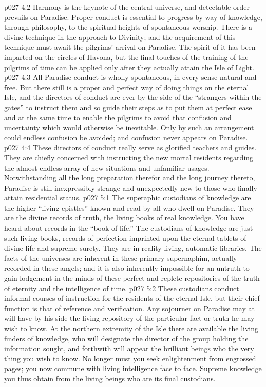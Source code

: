 \vs p027 4:2 Harmony is the keynote of the central universe, and detectable order prevails on Paradise. Proper conduct is essential to progress by way of knowledge, through philosophy, to the spiritual heights of spontaneous worship. There is a divine technique in the approach to Divinity; and the acquirement of this technique must await the pilgrims’ arrival on Paradise. The spirit of it has been imparted on the circles of Havona, but the final touches of the training of the pilgrims of time can be applied only after they actually attain the Isle of Light.
\vs p027 4:3 All Paradise conduct is wholly spontaneous, in every sense natural and free. But there still is a proper and perfect way of doing things on the eternal Isle, and the directors of conduct are ever by the side of the “strangers within the gates” to instruct them and so guide their steps as to put them at perfect ease and at the same time to enable the pilgrims to avoid that confusion and uncertainty which would otherwise be inevitable. Only by such an arrangement could endless confusion be avoided; and confusion never appears on Paradise.
\vs p027 4:4 These directors of conduct really serve as glorified teachers and guides. They are chiefly concerned with instructing the new mortal residents regarding the almost endless array of new situations and unfamiliar usages. Notwithstanding all the long preparation therefor and the long journey thereto, Paradise is still inexpressibly strange and unexpectedly new to those who finally attain residential status.
\vs p027 5:1 The superaphic custodians of knowledge are the higher “living epistles” known and read by all who dwell on Paradise. They are the divine records of truth, the living books of real knowledge. You have heard about records in the “book of life.” The custodians of knowledge are just such living books, records of perfection imprinted upon the eternal tablets of divine life and supreme surety. They are in reality living, automatic libraries. The facts of the universes are inherent in these primary supernaphim, actually recorded in these angels; and it is also inherently impossible for an untruth to gain lodgement in the minds of these perfect and replete repositories of the truth of eternity and the intelligence of time.
\vs p027 5:2 These custodians conduct informal courses of instruction for the residents of the eternal Isle, but their chief function is that of reference and verification. Any sojourner on Paradise may at will have by his side the living repository of the particular fact or truth he may wish to know. At the northern extremity of the Isle there are available the living finders of knowledge, who will designate the director of the group holding the information sought, and forthwith will appear the brilliant beings who  the very thing you wish to know. No longer must you seek enlightenment from engrossed pages; you now commune with living intelligence face to face. Supreme knowledge you thus obtain from the living beings who are its final custodians.
